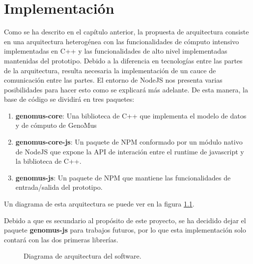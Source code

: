 \chapter{Implementación}\label{cap:implementacion}

Como se ha descrito en el capítulo anterior, la propuesta de arquitectura consiste en una arquitectura heterogénea con las funcionalidades de cómputo intensivo implementadas en C++ y las funcionalidades de alto nivel implementadas mantenidas del prototipo. Debido a la diferencia en tecnologías entre las partes de la arquitectura, resulta necesaria la implementación de un cauce de comunicación entre las partes. El entorno de NodeJS nos presenta varias posibilidades para hacer esto como se explicará más adelante. De esta manera, la base de código se dividirá en tres paquetes:

\begin{enumerate} 
    \item \textbf{genomus-core}\cite{genomus-core}: Una biblioteca de C++ que implementa el modelo de datos y de cómputo de GenoMus
    \item \textbf{genomus-core-js}\cite{genomus-core-js}: Un paquete de NPM conformado por un módulo nativo de NodeJS que expone la API de interación entre el runtime de javascript y la biblioteca de C++.
    \item \textbf{genomus-js}: Un paquete de NPM que mantiene las funcionalidades de entrada/salida del prototipo.
\end{enumerate}

Un diagrama de esta arquitectura se puede ver en la figura \ref{fig:arquitectura}.

Debido a que es secundario al propósito de este proyecto, se ha decidido dejar el paquete \textbf{genomus-js} para trabajos futuros, por lo que esta implementación solo contará con las dos primeras librerías.

\begin{figure}
    \centering
    \caption{Diagrama de arquitectura del software.}
    \label{fig:arquitectura}
\end{figure}

